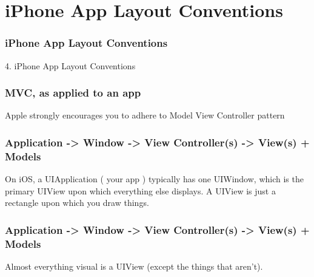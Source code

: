 \documentclass[10pt]{beamer}
\begin{document}
    

   
  

  
    
\section{iPhone App Layout Conventions}
\begin{frame}[fragile]
  \frametitle{iPhone App Layout Conventions}
  4. iPhone App Layout Conventions
\end{frame}


    
\begin{frame}[fragile]
  \frametitle{MVC, as applied to an app}
  Apple strongly encourages you to adhere to Model View Controller pattern

\end{frame}

    
\begin{frame}[fragile]
  \frametitle{Application -> Window -> View Controller(s) -> View(s) + Models}
  On iOS, a UIApplication ( your app ) typically has one UIWindow, which is the primary UIView upon which everything else displays.  A UIView is just a rectangle upon which you draw things.

\end{frame}

\begin{frame}[fragile]
  \frametitle{Application -> Window -> View Controller(s) -> View(s) + Models}
  Almost everything visual is a UIView (except the things that aren't).

\end{frame}
\end{document}
